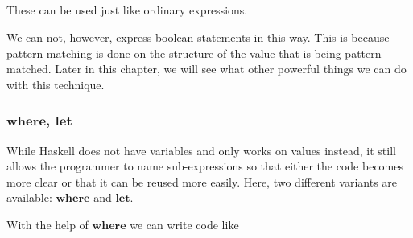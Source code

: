 \documentclass[paper=A4,twoside=true,openright,parskip=full,chapterprefix=true,headings=normal,bibliography=totoc,listof=totoc,titlepage=on,captions=tableabove,draft=false,british]{scrreprt}%
\begin{document}
\begin{hscode}\SaveRestoreHook
{}%
%
%
\>[B]{}\mathbin{::}\to {}\<[E]%
\\
\>[B]{}\;\mathrel{=}\;\;\<[E]%
\\
\>[B]{}\<[5]%
\>[5]{}\to {}\<[E]%
\\
\>[B]{}\<[5]%
\>[5]{}\to {}\mathbin{*}\<[E]%
\\
\>[B]{}\<[5]%
\>[5]{}\anonymous \to {}\mathbin{*}\<[E]%
\ColumnHook
\end{hscode}\resethooks
\vspace{-2\baselineskip}

These can be used just like ordinary expressions.

We can not, however, express boolean statements in this way. This is
because pattern matching is done on the structure of the value that is
being pattern matched. Later in this chapter, we will see what other
powerful things we can do with this technique.

\hypertarget{where-let}{%
\subsubsection{\texorpdfstring{\ensuremath{\mathbf{where}}, \ensuremath{\mathbf{let}}}{, }}\label{where-let}}

While Haskell does not have variables and only works on values instead,
it still allows the programmer to name sub-expressions so that either
the code becomes more clear or that it can be reused more easily. Here,
two different variants are available: \ensuremath{\mathbf{where}} and \ensuremath{\mathbf{let}}.

With the help of \ensuremath{\mathbf{where}} we can write code like
\end{document}
